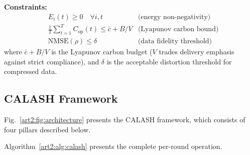 \textbf{Constraints:}
\begin{align}
    & E_i(t) \geq 0 \quad \forall i, t  &\text{(energy non-negativity)} \\
    & \frac{1}{T}\sum_{t=1}^{T} C_{\text{op}}(t) \leq \bar{c} + B/V  &\text{(Lyapunov carbon bound)} \\
    & \text{NMSE}(\rho) \leq \delta \quad &\text{(data fidelity threshold)}
\end{align}
where $\bar{c}+B/V$ is the Lyapunov carbon budget ($V$ trades delivery emphasis against strict compliance), and $\delta$ is the acceptable distortion threshold for compressed data.

\subsection{CALASH Framework}
\label{art2:sec:four_pillars}

Fig.~\ref{art2:fig:architecture} presents the CALASH framework, which consists of four pillars described below.

Algorithm~\ref{art2:alg:calash} presents the complete per-round operation.

